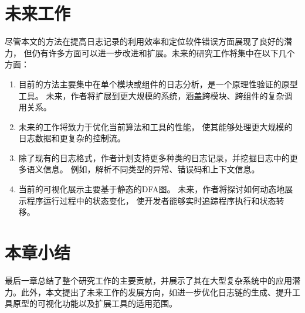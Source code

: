 \section{未来工作}
尽管本文的方法在提高日志记录的利用效率和定位软件错误方面展现了良好的潜力，
但仍有许多方面可以进一步改进和扩展。未来的研究工作将集中在以下几个方面：
\begin{enumerate}
    \item 目前的方法主要集中在单个模块或组件的日志分析，是一个原理性验证的原型工具。
    未来，作者将扩展到更大规模的系统，涵盖跨模块、跨组件的复杂调用关系。
    \item 未来的工作将致力于优化当前算法和工具的性能，
    使其能够处理更大规模的日志数据和更复杂的控制流。
    \item  除了现有的日志格式，作者计划支持更多种类的日志记录，并挖掘日志中的更多语义信息。
    例如，解析不同类型的异常、错误码和上下文信息。
    \item 当前的可视化展示主要基于静态的DFA图。
    未来，作者将探讨如何动态地展示程序运行过程中的状态变化，
    使开发者能够实时追踪程序执行和状态转移。
\end{enumerate}
\section{本章小结}
最后一章总结了整个研究工作的主要贡献，并展示了其在大型复杂系统中的应用潜力。此外，本文提出了未来工作的发展方向，如进一步优化日志链的生成、提升工具原型的可视化功能以及扩展工具的适用范围。